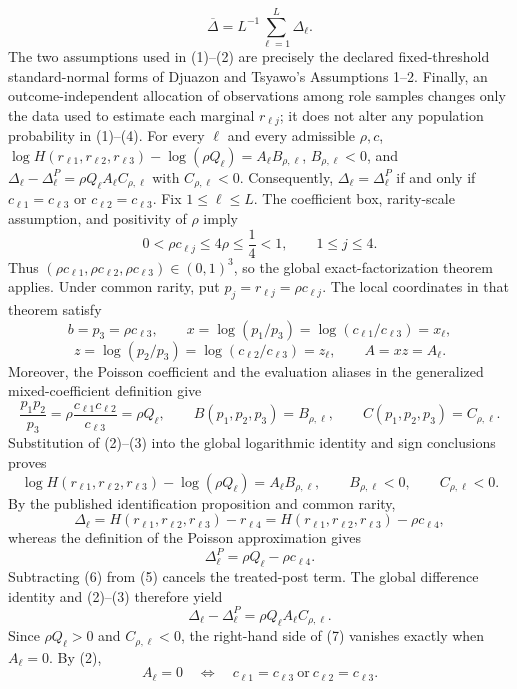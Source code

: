 \[
\overline\Delta=L^{-1}\sum_{\ell=1}^L\Delta_\ell.
\]
The two assumptions used in (1)--(2) are precisely the declared fixed-threshold standard-normal forms of Djuazon and Tsyawo's Assumptions 1--2.  Finally, an outcome-independent allocation of observations among role samples changes only the data used to estimate each marginal \(r_{\ell j}\); it does not alter any population probability in (1)--(4).
For every \(\ell\) and every admissible \(\rho,c\), \(\log H(r_{\ell1},r_{\ell2},r_{\ell3})-\log(\rho Q_{\ell})=A_{\ell}B_{\rho,\ell}\), \(B_{\rho,\ell}<0\), and \(\Delta_{\ell}-\Delta^P_{\ell}=\rho Q_{\ell}A_{\ell}C_{\rho,\ell}\) with \(C_{\rho,\ell}<0\). Consequently, \(\Delta_{\ell}=\Delta^P_{\ell}\) if and only if \(c_{\ell1}=c_{\ell3}\) or \(c_{\ell2}=c_{\ell3}\).
Fix \(1\le\ell\le L\).  The coefficient box, rarity-scale assumption, and positivity of \(\rho\) imply
\[
0<\rho c_{\ell j}\le4\rho\le\frac14<1,
\qquad 1\le j\le4.
\tag{1}
\]
Thus \((\rho c_{\ell1},\rho c_{\ell2},\rho c_{\ell3})\in(0,1)^3\), so the global exact-factorization theorem applies.  Under common rarity, put \(p_j=r_{\ell j}=\rho c_{\ell j}\).  The local coordinates in that theorem satisfy
\[
b=p_3=\rho c_{\ell3},
\qquad
x=\log(p_1/p_3)=\log(c_{\ell1}/c_{\ell3})=x_\ell,
\]
\[
z=\log(p_2/p_3)=\log(c_{\ell2}/c_{\ell3})=z_\ell,
\qquad
A=xz=A_\ell.
\tag{2}
\]
Moreover, the Poisson coefficient and the evaluation aliases in the generalized mixed-coefficient definition give
\[
\frac{p_1p_2}{p_3}=\rho\frac{c_{\ell1}c_{\ell2}}{c_{\ell3}}=\rho Q_\ell,
\qquad
B(p_1,p_2,p_3)=B_{\rho,\ell},
\qquad
C(p_1,p_2,p_3)=C_{\rho,\ell}.
\tag{3}
\]
Substitution of (2)--(3) into the global logarithmic identity and sign conclusions proves
\[
\log H(r_{\ell1},r_{\ell2},r_{\ell3})-\log(\rho Q_\ell)
=A_\ell B_{\rho,\ell},
\qquad
B_{\rho,\ell}<0,
\qquad C_{\rho,\ell}<0.
\tag{4}
\]
By the published identification proposition and common rarity,
\[
\Delta_\ell
=H(r_{\ell1},r_{\ell2},r_{\ell3})-r_{\ell4}
=H(r_{\ell1},r_{\ell2},r_{\ell3})-\rho c_{\ell4},
\tag{5}
\]
whereas the definition of the Poisson approximation gives
\[
\Delta^P_\ell=\rho Q_\ell-\rho c_{\ell4}.
\tag{6}
\]
Subtracting (6) from (5) cancels the treated-post term.  The global difference identity and (2)--(3) therefore yield
\[
\Delta_\ell-\Delta^P_\ell
=\rho Q_\ell A_\ell C_{\rho,\ell}.
\tag{7}
\]
Since \(\rho Q_\ell>0\) and \(C_{\rho,\ell}<0\), the right-hand side of (7) vanishes exactly when \(A_\ell=0\).  By (2),
\[
A_\ell=0
\quad\Longleftrightarrow\quad
c_{\ell1}=c_{\ell3}\ \text{or}\ c_{\ell2}=c_{\ell3}.
\]
